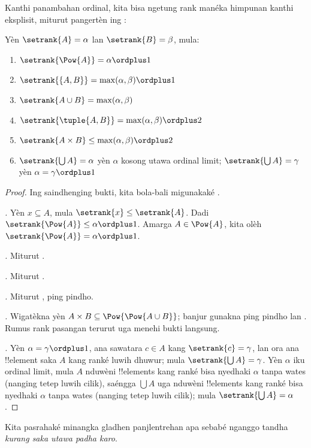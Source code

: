 \documentclass[../../../include/open-logic-section]{subfiles}
\begin{document}

Kanthi panambahan ordinal, kita bisa ngetung rank manéka
himpunan kanthi eksplisit, miturut pangertèn ing
:

\begin{lem}
Yèn $\setrank{A} = \alpha$ lan $\setrank{B} = \beta$, mula:
\begin{enumerate}
	\item{} $\setrank{\Pow{A}} = \alpha\ordplus 1$
	\item{} $\setrank{\{A, B\}} = \max(\alpha,
	\beta) \ordplus 1$
	\item{} $\setrank{A \cup B} = \max(\alpha,
	\beta)$
	\item{} $\setrank{\tuple{A,B}} = \max(\alpha,
	\beta) \ordplus  2$
	\item{} $\setrank{A \times B} \leq \max(\alpha,
	\beta) \ordplus  2$
	\item{} $\setrank{\bigcup A} = \alpha$ yèn
	$\alpha$ kosong utawa ordinal limit; $\setrank{\bigcup A} = \gamma$ yèn
	$\alpha = \gamma\ordplus 1$
\end{enumerate}
\end{lem}

\begin{proof}
Ing saindhenging bukti, kita bola-bali migunakaké
.

\emph{.} Yèn $x \subseteq A$, mula $\setrank{x} \leq
\setrank{A}$. Dadi $\setrank{\Pow{A}} \leq \alpha \ordplus  1$. Amarga $A
\in \Pow{A}$, kita olèh $\setrank{\Pow{A}} = \alpha \ordplus  1$.

\emph{.} Miturut .

\emph{.} Miturut .

\emph{.} Miturut , ping pindho.

\emph{.} Wigatèkna yèn $A \times B \subseteq
\Pow{\Pow{A \cup B}}$; banjur gunakna  ping pindho
lan .
Rumus rank pasangan terurut uga menehi bukti langsung.

\emph{.} Yèn $\alpha = \gamma\ordplus 1$, ana
sawatara $c \in A$ kang $\setrank{c} = \gamma$, lan ora ana !!{element} saka $A$
kang ranké luwih dhuwur; mula $\setrank{\bigcup A} = \gamma$. Yèn $\alpha$ iku
ordinal limit, mula $A$ nduwèni !!{element}s kang ranké bisa nyedhaki
$\alpha$ tanpa wates (nanging tetep luwih cilik), saéngga $\bigcup A$ uga nduwèni
!!{element}s kang ranké bisa nyedhaki $\alpha$ tanpa wates
(nanging tetep luwih cilik); mula $\setrank{\bigcup A} = \alpha$.
\end{proof}
\noindent
Kita pasrahaké minangka gladhen panjlentrehan apa sebabé
 nganggo tandha \emph{kurang saka utawa padha karo}.
\end{document}
